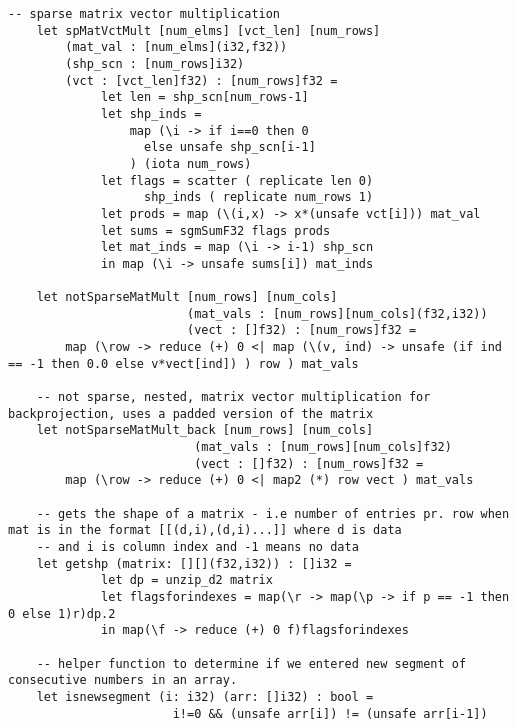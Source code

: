 \begin{lstlisting}[language=Futhark]
    -- sparse matrix vector multiplication
    let spMatVctMult [num_elms] [vct_len] [num_rows]
        (mat_val : [num_elms](i32,f32))
        (shp_scn : [num_rows]i32)
        (vct : [vct_len]f32) : [num_rows]f32 =
             let len = shp_scn[num_rows-1]
             let shp_inds =
                 map (\i -> if i==0 then 0
                   else unsafe shp_scn[i-1]
                 ) (iota num_rows)
             let flags = scatter ( replicate len 0)
                   shp_inds ( replicate num_rows 1)
             let prods = map (\(i,x) -> x*(unsafe vct[i])) mat_val
             let sums = sgmSumF32 flags prods
             let mat_inds = map (\i -> i-1) shp_scn
             in map (\i -> unsafe sums[i]) mat_inds

    let notSparseMatMult [num_rows] [num_cols]
                         (mat_vals : [num_rows][num_cols](f32,i32))
                         (vect : []f32) : [num_rows]f32 =
        map (\row -> reduce (+) 0 <| map (\(v, ind) -> unsafe (if ind == -1 then 0.0 else v*vect[ind]) ) row ) mat_vals

    -- not sparse, nested, matrix vector multiplication for backprojection, uses a padded version of the matrix
    let notSparseMatMult_back [num_rows] [num_cols]
                          (mat_vals : [num_rows][num_cols]f32)
                          (vect : []f32) : [num_rows]f32 =
        map (\row -> reduce (+) 0 <| map2 (*) row vect ) mat_vals

    -- gets the shape of a matrix - i.e number of entries pr. row when mat is in the format [[(d,i),(d,i)...]] where d is data
    -- and i is column index and -1 means no data
    let getshp (matrix: [][](f32,i32)) : []i32 =
             let dp = unzip_d2 matrix
             let flagsforindexes = map(\r -> map(\p -> if p == -1 then 0 else 1)r)dp.2
             in map(\f -> reduce (+) 0 f)flagsforindexes

    -- helper function to determine if we entered new segment of consecutive numbers in an array.
    let isnewsegment (i: i32) (arr: []i32) : bool =
                       i!=0 && (unsafe arr[i]) != (unsafe arr[i-1])


\end{lstlisting}
